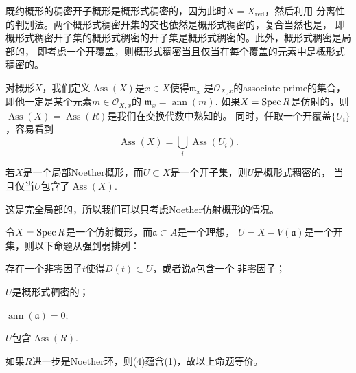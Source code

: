 既约概形的稠密开子概形是概形式稠密的，因为此时$X=X_{\text{red}}$，然后利用
分离性的判别法。两个概形式稠密开集的交也依然是概形式稠密的，复合当然也是，
即概形式稠密开子集的概形式稠密的开子集是概形式稠密的。此外，概形式稠密是局部的，
即考虑一个开覆盖，则概形式稠密当且仅当在每个覆盖的元素中是概形式稠密的。

\begin{para}
对概形$X$，我们定义$\operatorname{Ass}(X)$是$x\in X$使得$\mathfrak m_x$
是$\mathcal O_{X,x}$的associate prime的集合，
即他一定是某个元素$m\in \mathcal O_{X,x}$的
$\mathfrak m_x=\operatorname{ann}(m)$. 如果$X=\operatorname{Spec} R$是仿射的，则 
$\operatorname{Ass}(X)=\operatorname{Ass}(R)$是我们在交换代数中熟知的。
同时，任取一个开覆盖$\{U_i\}$，容易看到
\[
	\operatorname{Ass}(X)=\bigcup_i \operatorname{Ass}(U_i).
\]
\end{para}

\begin{pro}
	若$X$是一个局部Noether概形，而$U\subset X$是一个开子集，则$U$是概形式稠密的，
	当且仅当$U$包含了$\operatorname{Ass}(X)$. 
\end{pro}

这是完全局部的，所以我们可以只考虑Noether仿射概形的情况。

\begin{lem}
令$X=\operatorname{Spec} R$是一个仿射概形，而$\mathfrak a\subset A$是一个理想，
$U=X-V(\mathfrak a)$是一个开集，则以下命题从强到弱排列：
\begin{compactenum}[\quad (1)]
	\item 存在一个非零因子$t$使得$D(t)\subset U$，或者说$\mathfrak a$包含一个
	非零因子；
	\item $U$是概形式稠密的；
	\item $\operatorname{ann}(\mathfrak a)=0$;
	\item $U$包含$\operatorname{Ass}(R)$.
\end{compactenum}
如果$R$进一步是Noether环，则(4)蕴含(1)，故以上命题等价。
\end{lem}

